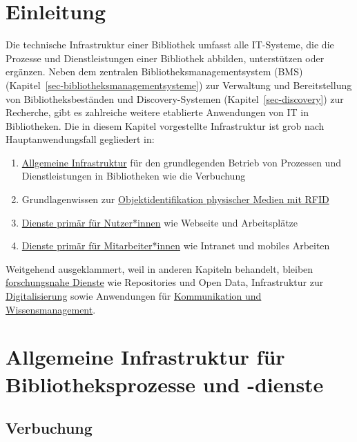\documentclass[
  11pt,
  letterpaper,
  DIV=11,
  twoside]{scrreprt}
\begin{document}
\section{Einleitung}\label{einleitung-1}

Die technische Infrastruktur einer Bibliothek umfasst alle IT-Systeme,
die die Prozesse und Dienstleistungen einer Bibliothek abbilden,
unterstützen oder ergänzen. Neben dem zentralen
Bibliotheksmanagementsystem (BMS)
(Kapitel~\ref{sec-bibliotheksmanagementsysteme}) zur Verwaltung und
Bereitstellung von Bibliotheksbeständen und Discovery-Systemen
(Kapitel~\ref{sec-discovery}) zur Recherche, gibt es zahlreiche weitere
etablierte Anwendungen von IT in Bibliotheken. Die in diesem Kapitel
vorgestellte Infrastruktur ist grob nach Hauptanwendungsfall gegliedert
in:

\begin{enumerate}
\def\labelenumi{\arabic{enumi}.}
\item
  \hyperref[allgemeine-infrastruktur-fuxfcr-bibliotheksprozesse-und--dienste]{Allgemeine
  Infrastruktur} für den grundlegenden Betrieb von Prozessen und
  Dienstleistungen in Bibliotheken wie die Verbuchung
\item
  Grundlagenwissen zur \hyperref[rfid]{Objektidentifikation physischer
  Medien mit RFID}
\item
  \hyperref[dienste-fuxfcr-nutzerinnen]{Dienste primär für Nutzer*innen}
  wie Webseite und Arbeitsplätze
\item
  \hyperref[dienste-fuxfcr-mitarbeiterinnen]{Dienste primär für
  Mitarbeiter*innen} wie Intranet und mobiles Arbeiten
\end{enumerate}

Weitgehend ausgeklammert, weil in anderen Kapiteln behandelt, bleiben
\hyperref[forschungsnahe-dienste]{forschungsnahe Dienste} wie
Repositories und Open Data, Infrastruktur zur
\hyperref[digitalisierung]{Digitalisierung} sowie Anwendungen für
\hyperref[kommunikation]{Kommunikation und Wissensmanagement}.

\section{Allgemeine Infrastruktur für Bibliotheksprozesse und
-dienste}\label{allgemeine-infrastruktur-fuxfcr-bibliotheksprozesse-und--dienste}

\subsection{Verbuchung}\label{verbuchung}
\end{document}
